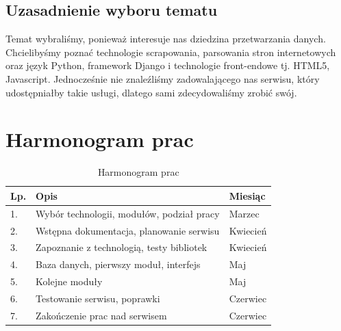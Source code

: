 \documentclass[12pt, titlepage]{article}
\begin{document}
	\subsection{Uzasadnienie wyboru tematu}
	Temat wybraliśmy, ponieważ interesuje nas dziedzina przetwarzania danych. Chcielibyśmy poznać technologie scrapowania, parsowania stron internetowych oraz język Python, framework Django i technologie front-endowe tj. HTML5, Javascript. Jednocześnie nie znaleźliśmy zadowalającego nas serwisu, który udostępniałby takie usługi, dlatego sami zdecydowaliśmy zrobić swój.
	
	\section{Harmonogram prac}
	\begin{table}[H]
		\setlength\extrarowheight{5pt}
		\centering
		\caption{Harmonogram prac}
		\label{harmonogram_prac}
		\begin{tabular}{ | C{2cm} | C{8cm} | C{6cm} | }
			\hline
			\textbf{Lp.} &	\textbf{Opis} &	\textbf{Miesiąc} \\ \hline

			1.& Wybór technologii, modułów, podział pracy & Marzec \\ \hline

			2.&	Wstępna dokumentacja, planowanie serwisu &	Kwiecień \\ \hline

			3.&	Zapoznanie z technologią, testy bibliotek &	Kwiecień \\ \hline

			4.&	Baza danych, pierwszy moduł, interfejs & Maj \\ \hline

			5.&	Kolejne moduły & Maj \\ \hline

			6.&	Testowanie serwisu, poprawki &	Czerwiec \\ \hline

			7.&	Zakończenie prac nad serwisem &	Czerwiec \\ \hline

		\end{tabular}
	\end{table}
	
\end{document}
